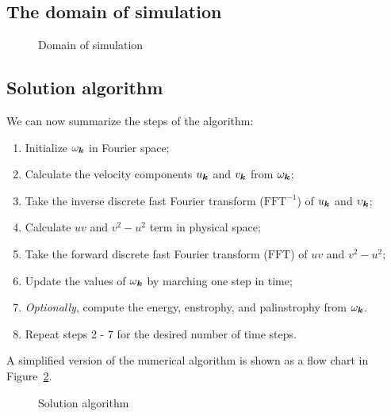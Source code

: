 \documentclass[12pt]{article}
\def\Eq#1{(\ref{#1})}
\begin{document}
\subsection{The domain of simulation}
\begin{figure}[ht]
\begin{center}
\caption{Domain of simulation}\label{domain}
\end{center}
\end{figure}
\newpage
\subsection{Solution algorithm}
We can now summarize the steps of the algorithm:
\begin{enumerate}
\item Initialize $\omega_{{\bm k}}$ in Fourier space;
\item Calculate the velocity components $u_{\bm k}$ and $v_{\bm k}$ from $\omega_{{\bm k}}$;
\item Take the inverse discrete fast Fourier transform
  ($\text{FFT}^{-1}$) of $u_{\bm k}$ and $\upsilon_{\bm k}$;
\item Calculate $uv$ and $v^2-u^2$ term in physical space;
\item Take the forward discrete fast Fourier transform ($\text{FFT}$) of
$uv$ and $v^2-u^2$;
\item Update the values of $\omega_{\bm k}$ by marching one step in time;
\item \emph{Optionally}, compute the energy, enstrophy, and palinstrophy from $\omega_{\bm k}$.
\item Repeat steps 2 - 7 for the desired number of time steps.
\end{enumerate}
A simplified version of the numerical algorithm is shown as a flow chart in Figure~\ref{algorithm}. 

\begin{figure}[ht]
\begin{center}
\caption{Solution algorithm}\label{algorithm}
\end{center}
\end{figure}

\hypertarget{Bibliography}{}


\hypertarget{Index}{}
\printindex
\end{document}
